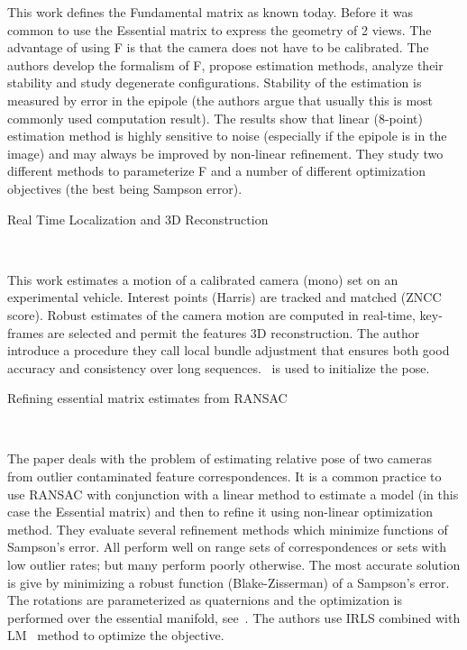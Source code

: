 \documentclass[10pt]{article}         %
\begin{document}
\begin{enumerate}
  This work defines the Fundamental matrix as known today.  Before it
  was common to use the Essential matrix to express the geometry of 2
  views.  The advantage of using F is that the camera does not have to
  be calibrated.  The authors develop the formalism of F, propose
  estimation methods, analyze their stability and study degenerate
  configurations.  Stability of the estimation is measured by error in
  the epipole (the authors argue that usually this is most commonly
  used computation result).  The results show that linear (8-point)
  estimation method is highly sensitive to noise (especially if the
  epipole is in the image) and may always be improved by non-linear
  refinement.  They study two different methods to parameterize F and
  a number of different optimization objectives (the best being
  Sampson error).

  {\Large \item Real Time Localization and 3D
    Reconstruction}~\cite{mouragnon2006real}

  This work estimates a motion of a calibrated camera (mono) set on an
  experimental vehicle.  Interest points (Harris) are tracked and
  matched (ZNCC score). Robust estimates of the camera motion are
  computed in real-time, key-frames are selected and permit the
  features 3D reconstruction.  The author introduce a procedure they
  call local bundle adjustment that ensures both good accuracy and
  consistency over long sequences.~\cite{nister2004efficient} is used
  to initialize the pose.

  {\Large \item Refining essential matrix estimates from
    RANSAC}~\cite{botterillrefining}

  The paper deals with the problem of estimating relative pose of two
  cameras from outlier contaminated feature correspondences.  It is a
  common practice to use RANSAC with conjunction with a linear method
  to estimate a model (in this case the Essential matrix) and then to
  refine it using non-linear optimization method. They evaluate
  several refinement methods which minimize functions of Sampson's
  error.  All perform well on range sets of correspondences or sets
  with low outlier rates; but many perform poorly otherwise.  The most
  accurate solution is give by minimizing a robust function
  (Blake-Zisserman) of a Sampson's error.  The rotations are
  parameterized as quaternions and the optimization is performed over
  the essential manifold, see~\cite{schmidt2001using}.  The authors
  use IRLS combined with LM~\cite{marquardt1963algorithm} method to
  optimize the objective.


\end{enumerate}
\end{document}

